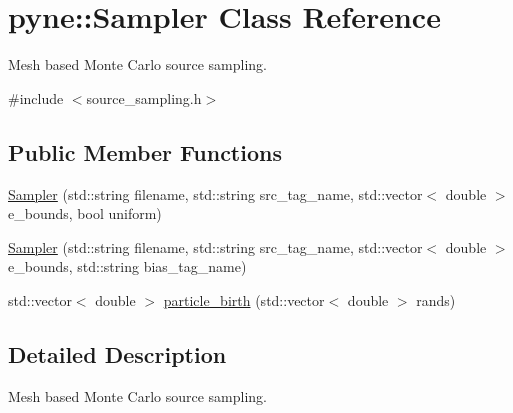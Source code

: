 \hypertarget{classpyne_1_1_sampler}{\section{pyne\+:\+:Sampler Class Reference}
\label{classpyne_1_1_sampler}
}


Mesh based Monte Carlo source sampling.  




{\ttfamily \#include $<$source\+\_\+sampling.\+h$>$}

\subsection*{Public Member Functions}
\begin{DoxyCompactItemize}
\item 
\hyperlink{classpyne_1_1_sampler_a57e096205922e6a221f2185a9849c5ed}{Sampler} (std\+::string filename, std\+::string src\+\_\+tag\+\_\+name, std\+::vector$<$ double $>$ e\+\_\+bounds, bool uniform)
\item 
\hyperlink{classpyne_1_1_sampler_a058411845da467ff7421956ba076ac31}{Sampler} (std\+::string filename, std\+::string src\+\_\+tag\+\_\+name, std\+::vector$<$ double $>$ e\+\_\+bounds, std\+::string bias\+\_\+tag\+\_\+name)
\item 
std\+::vector$<$ double $>$ \hyperlink{classpyne_1_1_sampler_aa5d177ee74199617fc08e4a7a7686e8f}{particle\+\_\+birth} (std\+::vector$<$ double $>$ rands)
\end{DoxyCompactItemize}


\subsection{Detailed Description}
Mesh based Monte Carlo source sampling. 

